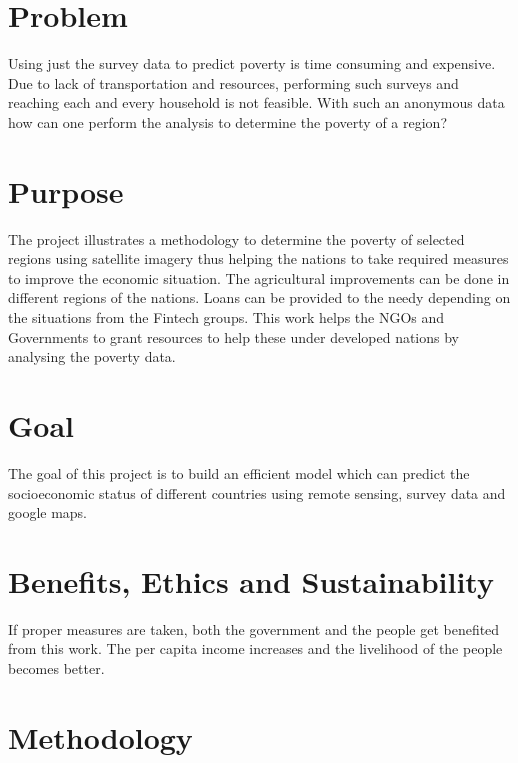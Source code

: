 \section{Problem}
Using just the survey data to predict poverty is time consuming and expensive. Due to lack of transportation and resources, performing such surveys and reaching each and every household is not feasible. With such an anonymous data how can one perform the analysis to determine the poverty of a region?


\section{Purpose}
 The project illustrates a methodology to determine the poverty of selected regions using satellite imagery thus helping the nations to take required measures to improve the economic situation. The agricultural improvements can be done in different regions of the nations. Loans can be provided to the needy depending on the situations from the Fintech groups. This work helps the \ac{NGO}s and Governments to grant resources to help these under developed nations by analysing the poverty data.


\section{Goal}
The goal of this project is to build an efficient model which can predict the socioeconomic status of different countries using remote sensing, survey data and google maps.

\section{Benefits, Ethics and Sustainability}
If proper measures are taken, both the government and the people get benefited from this work. The per capita income increases and the livelihood of the people becomes better.


\section{Methodology}

